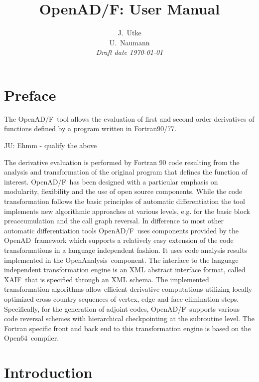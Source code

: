 \documentclass{book}
\title{OpenAD/F: User Manual}
\author{J.~Utke  \\
U.~Naumann \\
{\small\em  Draft date \today }}
\date{ }
\newcommand{\OpenADF}{OpenAD/F}
\newcommand{\OpenAD}{OpenAD}
\newcommand{\OpenAnalysis}{OpenAnalysis}
\newcommand{\OpenSixtyFour}{Open64}
\newcommand{\xaif}{XAIF}
\begin{document}
\maketitle
\tableofcontents
\listoffigures
\listoftables
\chapter*{Preface}\normalsize
\pagestyle{plain}	
  The \OpenADF\ tool allows the evaluation of first and second order
  derivatives of functions defined by a program written in Fortran90/77.

  {\color{red} JU: Ehmm - qualify the above } 

  The derivative evaluation is performed by Fortran 90 code resulting
  from the analysis and transformation of the original program that
  defines the function of interest. 
  \OpenADF\ has been designed with a particular emphasis on  modularity, 
  flexibility and the use of open source components. 
  While the code transformation follows the
  basic principles of automatic differentiation the tool implements 
  new algorithmic approaches at various levels, e.g. for the basic block 
  preaccumulation  and the call graph reversal.
  In difference to most
  other automatic differentiation tools \OpenADF\ uses components 
  provided by the \OpenAD\ framework which supports a relatively 
  easy extension of the code transformations
  in a language independent fashion. 
  It uses code analysis results
  implemented in the \OpenAnalysis\ component.  The interface to the
  language independent transformation engine is an XML abstract
  interface format, called \xaif\ that is specified through an XML
  schema.  The implemented transformation algorithms allow efficient
  derivative computations utilizing locally optimized cross country
  sequences of vertex, edge and face elimination steps.  Specifically,
  for the generation of adjoint codes, \OpenADF\ supports various code
  reversal schemes with hierarchical checkpointing at the subroutine
  level.  The Fortran specific front and back end to this transformation
  engine is based on the \OpenSixtyFour\ compiler.

\pagestyle{headings}
\chapter{Introduction} \label{chap:Introduction}
\end{document}
